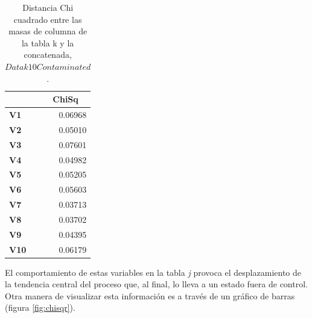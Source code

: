 \documentclass[mathematics,article,submit,moreauthors,pdftex]{mdpi}
\begin{document}
\begin{table}[H]
\centering
\begin{tabular}{lr}
\toprule
\multicolumn{1}{c}{\cellcolor[HTML]{FFFFFF}{\color[HTML]{000000} \textbf{Variables}}} & \multicolumn{1}{c}{\textbf{ChiSq}} \\ \midrule

\textbf{V1}                                                                             & {\color[HTML]{333333} 0.06968}      \\ 
\textbf{V2}                                                                       & {\color[HTML]{333333} 0.05010}      \\ 
\textbf{V3}                                                                       & {\color[HTML]{333333} 0.07601}      \\ 
\textbf{V4}                                                                       & {\color[HTML]{333333} 0.04982}      \\ 
\textbf{V5}                                                                       & {\color[HTML]{333333} 0.05205}      \\ 
\textbf{V6}                                                                       & {\color[HTML]{333333} 0.05603}      \\ 
\textbf{V7}                                                                       & {\color[HTML]{333333} 0.03713}      \\ 
\textbf{V8}                                                                       & {\color[HTML]{333333} 0.03702}      \\ 
\textbf{V9}                                                                       & {\color[HTML]{333333} 0.04395}      \\ 
\textbf{V10}                                                                            & {\color[HTML]{333333} 0.06179}      \\ \hline
\end{tabular}
\caption{Distancia Chi cuadrado entre las masas de columna de la tabla k y la concatenada, $Datak10Contaminated$.}

\label{tab:chiexamp}
\end{table}

El comportamiento de estas variables en la tabla \emph{j} provoca el
desplazamiento de la tendencia central del proceso que, al final, lo
lleva a un estado fuera de control. Otra manera de visualizar esta
información es a través de un gráfico de barras (figura
\ref{fig:chisqr}).
\end{document}
